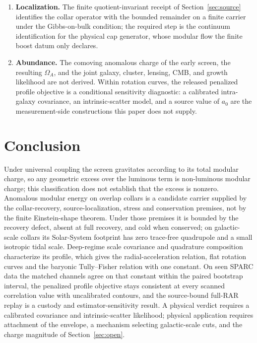 \documentclass[11pt]{article}
\begin{document}
\begin{enumerate}
those two premises from the collar geometry of a point source, and extending the
profile through the transition to the Newtonian regime.
\item \textbf{Localization.} The finite quotient-invariant receipt of
Section~\ref{sec:source} identifies the collar operator with the bounded
remainder on a finite carrier under the Gibbs-on-bulk condition; the
required step is the continuum identification for the physical cap generator,
whose modular flow the finite boost datum only declares.
\item \textbf{Abundance.} The comoving anomalous charge of the early screen,
the resulting \(\Omega_A\), and the joint galaxy, cluster, lensing, CMB, and
growth likelihood are not derived. Within rotation curves, the released
penalized profile objective is a conditional sensitivity diagnostic: a
calibrated intra-galaxy covariance, an intrinsic-scatter model, and a
source value of \(a_0\) are the measurement-side constructions this paper does not supply.
\end{enumerate}

\section{Conclusion}

Under universal coupling the screen gravitates according to its total
modular charge, so any geometric excess over the luminous term is
non-luminous modular charge; this classification does not establish that the
excess is nonzero. Anomalous modular energy on overlap collars is a candidate
carrier supplied by the collar-recovery, source-localization, stress and
conservation premises, not by the finite Einstein-shape theorem. Under those
premises it is bounded by the recovery defect, absent at full recovery, and
cold when conserved; on galactic-scale collars its Solar-System footprint has
zero trace-free quadrupole and a small isotropic tidal scale. Deep-regime
scale covariance and quadrature composition characterize its profile, which
gives the radial-acceleration relation, flat rotation curves and the baryonic
Tully--Fisher relation with one constant. On seen SPARC data the matched
channels agree on that constant within the paired bootstrap interval, the
penalized profile objective stays consistent at every scanned correlation
value with uncalibrated contours, and the source-bound full-RAR replay is a
custody and estimator-sensitivity result. A physical verdict requires a
calibrated covariance and intrinsic-scatter likelihood; physical application
requires attachment of the envelope, a mechanism selecting galactic-scale
cuts, and the charge magnitude of Section~\ref{sec:open}.
\end{document}
